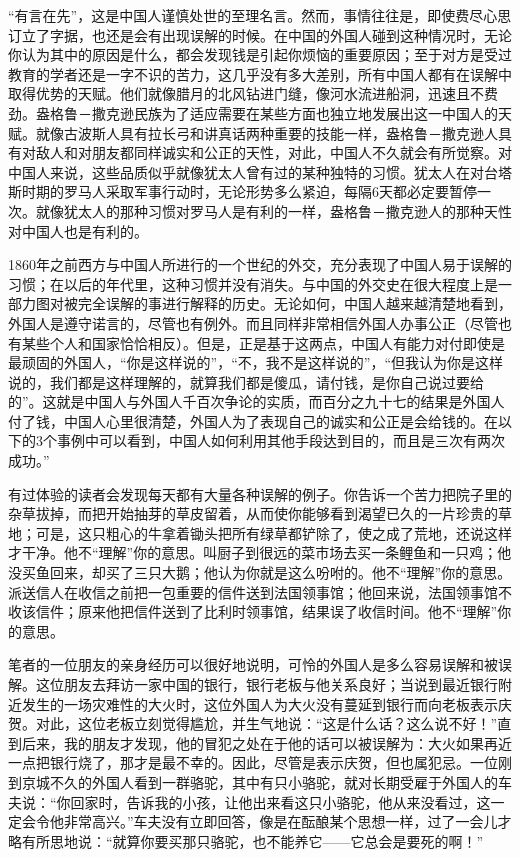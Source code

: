 \documentclass[12pt,oneside]{book}
\begin{document}
\begin{common-format}
“有言在先”，这是中国人谨慎处世的至理名言。然而，事情往往是，即使费尽心思订立了字据，也还是会有出现误解的时候。在中国的外国人碰到这种情况时，无论你认为其中的原因是什么，都会发现钱是引起你烦恼的重要原因；至于对方是受过教育的学者还是一字不识的苦力，这几乎没有多大差别，所有中国人都有在误解中取得优势的天赋。他们就像腊月的北风钻进门缝，像河水流进船洞，迅速且不费劲。盎格鲁－撒克逊民族为了适应需要在某些方面也独立地发展出这一中国人的天赋。就像古波斯人具有拉长弓和讲真话两种重要的技能一样，盎格鲁－撒克逊人具有对敌人和对朋友都同样诚实和公正的天性，对此，中国人不久就会有所觉察。对中国人来说，这些品质似乎就像犹太人曾有过的某种独特的习惯。犹太人在对台塔斯时期的罗马人采取军事行动时，无论形势多么紧迫，每隔6天都必定要暂停一次。就像犹太人的那种习惯对罗马人是有利的一样，盎格鲁－撒克逊人的那种天性对中国人也是有利的。 

1860年之前西方与中国人所进行的一个世纪的外交，充分表现了中国人易于误解的习惯；在以后的年代里，这种习惯并没有消失。与中国的外交史在很大程度上是一部力图对被完全误解的事进行解释的历史。无论如何，中国人越来越清楚地看到，外国人是遵守诺言的，尽管也有例外。而且同样非常相信外国人办事公正（尽管也有某些个人和国家恰恰相反）。但是，正是基于这两点，中国人有能力对付即使是最顽固的外国人，“你是这样说的”，“不，我不是这样说的”，“但我认为你是这样说的，我们都是这样理解的，就算我们都是傻瓜，请付钱，是你自己说过要给的”。这就是中国人与外国人千百次争论的实质，而百分之九十七的结果是外国人付了钱，中国人心里很清楚，外国人为了表现自己的诚实和公正是会给钱的。在以下的3个事例中可以看到，中国人如何利用其他手段达到目的，而且是三次有两次成功。” 

有过体验的读者会发现每天都有大量各种误解的例子。你告诉一个苦力把院子里的杂草拔掉，而把开始抽芽的草皮留着，从而使你能够看到渴望已久的一片珍贵的草地；可是，这只粗心的牛拿着锄头把所有绿草都铲除了，使之成了荒地，还说这样才干净。他不“理解”你的意思。叫厨子到很远的菜市场去买一条鲤鱼和一只鸡；他没买鱼回来，却买了三只大鹅；他认为你就是这么吩咐的。他不“理解”你的意思。派送信人在收信之前把一包重要的信件送到法国领事馆；他回来说，法国领事馆不收该信件；原来他把信件送到了比利时领事馆，结果误了收信时间。他不“理解”你的意思。 

笔者的一位朋友的亲身经历可以很好地说明，可怜的外国人是多么容易误解和被误解。这位朋友去拜访一家中国的银行，银行老板与他关系良好；当说到最近银行附近发生的一场灾难性的大火时，这位外国人为大火没有蔓延到银行而向老板表示庆贺。对此，这位老板立刻觉得尴尬，并生气地说：“这是什么话？这么说不好！”直到后来，我的朋友才发现，他的冒犯之处在于他的话可以被误解为：大火如果再近一点把银行烧了，那才是最不幸的。因此，尽管是表示庆贺，但也属犯忌。一位刚到京城不久的外国人看到一群骆驼，其中有只小骆驼，就对长期受雇于外国人的车夫说：“你回家时，告诉我的小孩，让他出来看这只小骆驼，他从来没看过，这一定会令他非常高兴。”车夫没有立即回答，像是在酝酿某个思想一样，过了一会儿才略有所思地说：“就算你要买那只骆驼，也不能养它——它总会是要死的啊！” 


\end{common-format}
\end{document}
